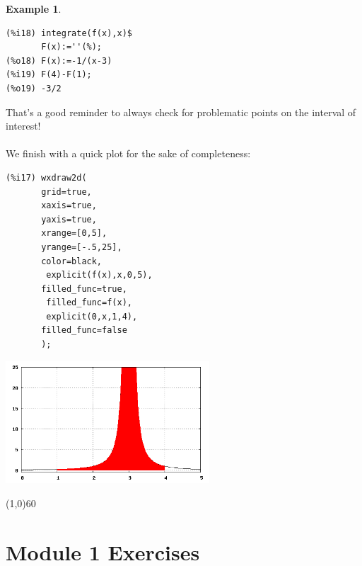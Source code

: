 \documentclass[10.5pt,twoside]{report}
\theoremstyle{definition}
\newtheorem{exmp}{Example}[section]
\begin{document}
\begin{exmp}
\begin{verbatim}
(%i18) integrate(f(x),x)$
       F(x):=''(%);
(%o18) F(x):=-1/(x-3)
(%i19) F(4)-F(1);
(%o19) -3/2
\end{verbatim}

That's a good reminder to always check for problematic points on the interval of interest!\\
${}$\\


We finish with a quick plot for the sake of completeness:

\begin{verbatim}
(%i17) wxdraw2d(
       grid=true,
       xaxis=true,
       yaxis=true,
       xrange=[0,5],
       yrange=[-.5,25],
       color=black,
        explicit(f(x),x,0,5),
       filled_func=true,
        filled_func=f(x),
        explicit(0,x,1,4),
       filled_func=false
       );
\end{verbatim}

\includegraphics[width=3in]{example_1_4_3_1}






\end{exmp}

\line(1,0){60}
\linethickness{0.5mm}
\pagebreak

\section{Module 1 Exercises}\label{Module 1 Exercises}
\end{document}
